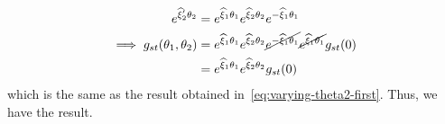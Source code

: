 \begin{align*}
    e^{\widehat{\xi}_2' \theta_2}
     & =
    e^{\widehat{\xi}_1 \theta_1}
    e^{\widehat{\xi}_2 \theta_2}
    e^{-\widehat{\xi}_1 \theta_1}
    \\
    \implies
    g_{st}(\theta_1, \theta_2)
     & =
    e^{\widehat{\xi}_1 \theta_1}
    e^{\widehat{\xi}_2 \theta_2}
    \cancel{e^{-\widehat{\xi}_1 \theta_1}}
    \cancel{e^{\widehat{\xi}_1 \theta_1}}
    g_{st}(0)
    \nonumber
    \\ & =
    e^{\widehat{\xi}_1 \theta_1}
    e^{\widehat{\xi}_2 \theta_2}
    g_{st}(0)
\end{align*}
which is the same as the result obtained in~\eqref{eq:varying-theta2-first}.
Thus, we have the result.
